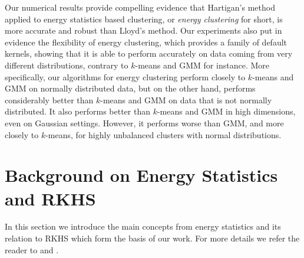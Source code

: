 \documentclass[aps,preprint,nofootinbib,floatfix]{revtex4-1}
\begin{document}
Our numerical results provide compelling evidence that 
Hartigan's method applied to energy statistics based clustering, 
or \emph{energy clustering} for short, is more accurate and robust than 
Lloyd's method. Our experiments also put in evidence the
flexibility of energy clustering, which provides a family of default kernels, 
showing that it is able to perform accurately on data coming from 
very different distributions, contrary to $k$-means and GMM for instance.
More specifically, our algorithms for energy clustering perform 
closely to $k$-means and GMM on normally distributed data, but on the other
hand, performs considerably better than $k$-means and GMM on  data that 
is not normally distributed. It also performs better than $k$-means 
and GMM in high dimensions, even on Gaussian settings. However, it performs 
worse than GMM, and more closely to $k$-means, for highly unbalanced clusters
with normal distributions.



\section{Background on Energy Statistics and RKHS}
\label{sec:background}

In this section we introduce the main concepts from energy
statistics and its relation to 
RKHS which form the basis of our work.
For more details we refer the reader
to \cite{Szkely2013} and \cite{Sejdinovic2013}.
\end{document}
